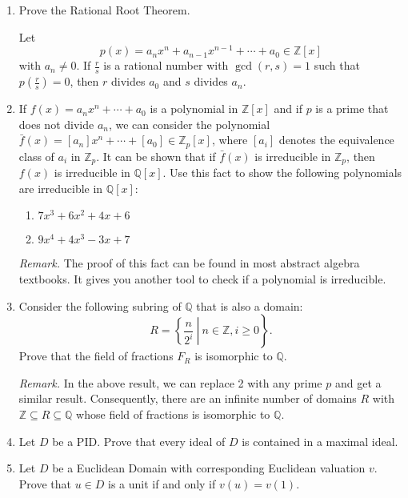 \begin{enumerate}[label={\sffamily\bfseries\color{main}\arabic*.}]
	\item Prove the Rational Root Theorem.

	\begin{theorem*}
		Let
		$$p(x)=a_nx^n+a_{n-1}x^{n-1}+\cdots+a_0\in\mathbb Z[x]$$
		with $a_n\neq 0$. If $\frac rs$ is a rational number with $\gcd(r,s)=1$ such that $p\left(\frac rs\right)=0$, then $r$ divides $a_0$ and $s$ divides $a_n$.
	\end{theorem*}

	\item If $f(x)=a_nx^n+\cdots +a_0$ is a polynomial in $\mathbb Z[x]$ and if $p$ is a prime that does not divide $a_n$, we can consider the polynomial $\bar f(x)=[a_n]x^n+\cdots+[a_0]\in\mathbb Z_p[x]$, where $[a_i]$ denotes the equivalence class of $a_i$ in $\mathbb Z_p$. It can be shown that if $\bar f(x)$ is irreducible in $\mathbb Z_p$, then $f(x)$ is irreducible in $\mathbb Q[x]$. Use this fact to show the following polynomials are irreducible in $\mathbb Q[x]$:
	\begin{enumerate}
		\item $7x^3+6x^2+4x+6$
		\item $9x^4+4x^3-3x+7$
	\end{enumerate}

	{\footnotesize\textit{\color{main}Remark.} The proof of this fact can be found in most abstract algebra textbooks. It gives you another tool to check if a polynomial is irreducible.\par}

	\item Consider the following subring of $\mathbb Q$ that is also a domain:
	$$R=\left.\left\{\frac{n}{2^i}~\right|~ n\in\mathbb Z,i\geq 0\right\}.$$
	Prove that the field of fractions $F_R$ is isomorphic to $\mathbb Q$.

	{\footnotesize\textit{\color{main}Remark.} In the above result, we can replace 2 with any prime $p$ and get a similar result. Consequently, there are an infinite number of domains $R$ with $\mathbb Z\subseteq R\subseteq\mathbb Q$ whose field of fractions is isomorphic to $\mathbb Q$.\par}

	\item Let $D$ be a PID. Prove that every ideal of $D$ is contained in a maximal ideal.

	\item Let $D$ be a Euclidean Domain with corresponding Euclidean valuation $v$. Prove that $u\in D$ is a unit if and only if $v(u)=v(1)$.


\end{enumerate}
